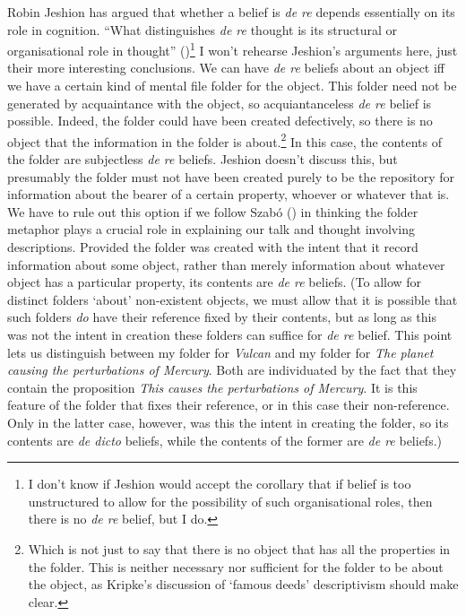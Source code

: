 \documentclass[
  10pt,
  letterpaper,
  DIV=11,
  numbers=noendperiod,
  twoside]{scrartcl}
\begin{document}
Robin Jeshion has argued that whether a belief is \emph{de re} depends
essentially on its role in cognition. ``What distinguishes \emph{de re}
thought is its structural or organisational role in thought''
()\footnote{I don't know if
  Jeshion would accept the corollary that if belief is too unstructured
  to allow for the possibility of such organisational roles, then there
  is no \emph{de re} belief, but I do.} I won't rehearse Jeshion's
arguments here, just their more interesting conclusions. We can have
\emph{de re} beliefs about an object iff we have a certain kind of
mental file folder for the object. This folder need not be generated by
acquaintance with the object, so acquiantanceless \emph{de re} belief is
possible. Indeed, the folder could have been created defectively, so
there is no object that the information in the folder is
about.\footnote{Which is not just to say that there is no object that
  has all the properties in the folder. This is neither necessary nor
  sufficient for the folder to be about the object, as Kripke's
  discussion of `famous deeds' descriptivism should make clear.} In this
case, the contents of the folder are subjectless \emph{de re} beliefs.
Jeshion doesn't discuss this, but presumably the folder must not have
been created purely to be the repository for information about the
bearer of a certain property, whoever or whatever that is. We have to
rule out this option if we follow Szabó ()
in thinking the folder metaphor plays a crucial role in explaining our
talk and thought involving descriptions. Provided the folder was created
with the intent that it record information about some object, rather
than merely information about whatever object has a particular property,
its contents are \emph{de re} beliefs. (To allow for distinct folders
`about' non-existent objects, we must allow that it is possible that
such folders \emph{do} have their reference fixed by their contents, but
as long as this was not the intent in creation these folders can suffice
for \emph{de re} belief. This point lets us distinguish between my
folder for \emph{Vulcan} and my folder for \emph{The planet causing the
perturbations of Mercury}. Both are individuated by the fact that they
contain the proposition \emph{This} \emph{causes the perturbations of
Mercury}. It is this feature of the folder that fixes their reference,
or in this case their non-reference. Only in the latter case, however,
was this the intent in creating the folder, so its contents are \emph{de
dicto} beliefs, while the contents of the former are \emph{de re}
beliefs.)
\end{document}
